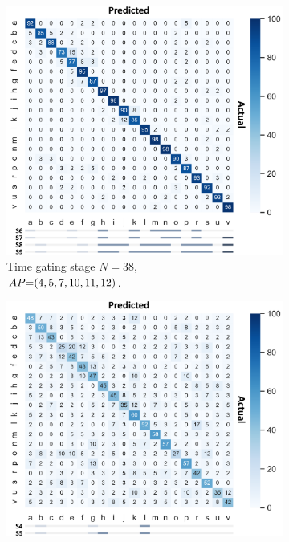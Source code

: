 \begin{figure}
    \centering
    \begin{subfigure}{.69\linewidth}
        \includegraphics[width=\linewidth]{Figures/RadarExperiments/Datasets/20Gestures/Results/All/UD-time-gating-38-4_5_7_10_11_12-cm-2.pdf}
        \vspace{-12pt}
        \caption{Time gating stage $N{=}38$, \\ $\splitatcommas{AP{=}(4, 5, 7, 10, 11, 12)}$.}
        \vspace{6pt}
        \label{fig:radar-experiments:confusion-exp1-UD-timegating}
    \end{subfigure}
    \begin{subfigure}{.69\linewidth}
        \includegraphics[width=\linewidth]{Figures/RadarExperiments/Datasets/20Gestures/Results/All/UD-Filtering-26-1_2_3_4_5_6_7_8_9_10_11_12-cm-2.pdf}

\end{subfigure}
\end{figure}
